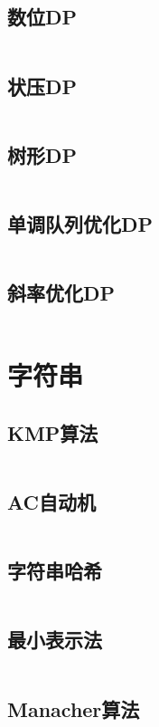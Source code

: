 \documentclass[a4paper,10pt]{article}
\begin{document}
\subsection{数位DP}
\inputminted[breaklines, linenos]{c++}{dp/shuwei.cc}
\subsection{状压DP}
\inputminted[breaklines, linenos]{c++}{dp/zhuangya.cc}
\subsection{树形DP}
\inputminted[breaklines, linenos]{c++}{dp/treedp.cc}
\subsection{单调队列优化DP}
\inputminted[breaklines, linenos]{c++}{dp/dddl.cc}
\subsection{斜率优化DP}
\inputminted[breaklines, linenos]{c++}{dp/xielv.cc}

\newpage
\section{字符串}
\subsection{KMP算法}
\inputminted[breaklines, linenos]{c++}{string/kmp.cc}
\subsection{AC自动机}
\inputminted[breaklines, linenos]{c++}{string/ac_auto.cc}
\subsection{字符串哈希}
\inputminted[breaklines, linenos]{c++}{string/hash.cc}
\subsection{最小表示法}
\inputminted[breaklines, linenos]{c++}{string/minimal.cc}
\subsection{Manacher算法}
\inputminted[breaklines, linenos]{c++}{string/manacher.cc}
\end{document}
